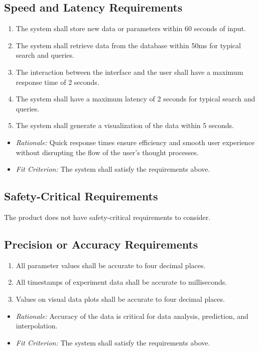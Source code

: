 \documentclass[12pt]{article}
\begin{document}
\subsection{Speed and Latency Requirements}
\begin{enumerate}
\item The system shall store new data or parameters within 60 seconds of input.
\item The system shall retrieve data from the database within 50ms for typical
search and queries.
\item The interaction between the interface and the user shall have a maximum
response time of 2 seconds.
\item The system shall have a maximum latency of 2 seconds for typical search
and queries.
\item The system shall generate a visualization of the data within 5 seconds.
\end{enumerate}
\begin{itemize}
  \item \textit{Rationale:} Quick response times ensure efficiency and smooth
  user experience without disrupting the flow of the user's thought processes.
  \item \textit{Fit Criterion:} The system shall satisfy the requirements above.
\end{itemize}

\subsection{Safety-Critical Requirements}
The product does not have safety-critical requirements to consider.

\subsection{Precision or Accuracy Requirements}
\begin{enumerate}
  \item All parameter values shall be accurate to four decimal places.
  \item All timestamps of experiment data shall be accurate to milliseconds. 
  \item Values on visual data plots shall be accurate to four decimal places.
\end{enumerate}
\begin{itemize}
  \item \textit{Rationale:} Accuracy of the data is critical for data analysis,
  prediction, and interpolation.
  \item \textit{Fit Criterion:} The system shall satisfy the requirements above.
\end{itemize}
\end{document}
